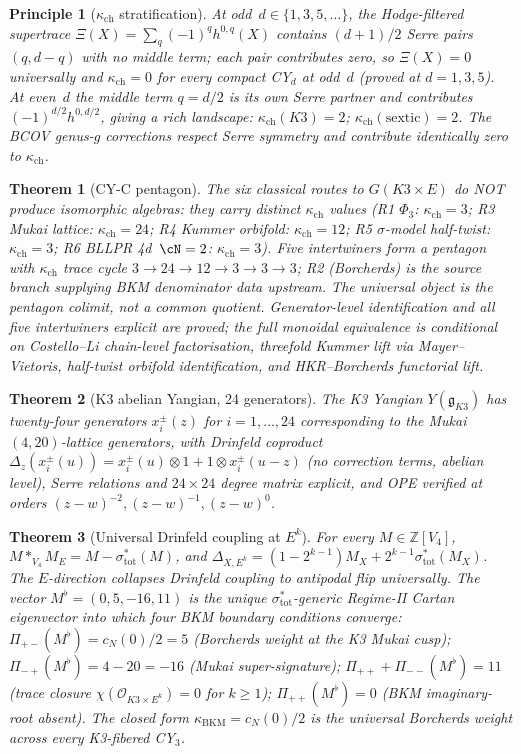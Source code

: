 \documentclass[11pt]{article}
\providecommand{\cO}{\mathcal{O}}
\providecommand{\bZ}{\mathbb{Z}}
\providecommand{\fg}{\mathfrak{g}}
\providecommand{\kBKM}{\kappa_{\mathrm{BKM}}}
\providecommand{\kch}{\kappa_{\mathrm{ch}}}
\newtheorem{theorem}{Theorem}[section]
\newtheorem*{principle}{Principle}
\begin{document}
\begin{principle}[$\kch$ stratification]
At odd~$d\in\{1,3,5,\ldots\}$, the Hodge-filtered supertrace
$\Xi(X) = \sum_q(-1)^q h^{0,q}(X)$ contains $(d+1)/2$ Serre pairs
$(q, d{-}q)$ with no middle term; each pair contributes zero, so
$\Xi(X) = 0$ universally and $\kch = 0$ for every compact CY$_d$ at
odd~$d$ \textup{(}proved at $d=1,3,5$\textup{)}. At even~$d$ the
middle term $q=d/2$ is its own Serre partner and contributes
$(-1)^{d/2}h^{0,d/2}$, giving a rich landscape:
$\kch(K3)=2$; $\kch(\mathrm{sextic})=2$. The BCOV genus-$g$
corrections respect Serre symmetry and contribute identically zero
to $\kch$.
\end{principle}

\begin{theorem}[CY-C pentagon]
The six classical routes to $G(K3\times E)$ do NOT produce
isomorphic algebras: they carry distinct $\kch$ values
\textup{(R1 $\Phi_3$: $\kch=3$; R3 Mukai lattice: $\kch=24$;
R4 Kummer orbifold: $\kch=12$; R5 $\sigma$-model half-twist:
$\kch=3$; R6 BLLPR 4d~$\cN=2$: $\kch=3$\textup{)}}. Five
intertwiners form a pentagon with $\kch$ trace cycle
$3\to 24\to 12\to 3\to 3\to 3$; R2 \textup{(}Borcherds\textup{)} is
the source branch supplying BKM denominator data upstream. The
universal object is the pentagon colimit, not a common quotient.
Generator-level identification and all five intertwiners explicit
are proved; the full monoidal equivalence is conditional on
Costello--Li chain-level factorisation,
threefold Kummer lift via Mayer--Vietoris,
half-twist orbifold identification,
and HKR--Borcherds functorial lift.
\end{theorem}

\begin{theorem}[K3 abelian Yangian, 24 generators]
The K3 Yangian $Y(\fg_{K3})$ has twenty-four generators
$x^{\pm}_i(z)$ for $i=1,\ldots,24$ corresponding to the Mukai
$(4,20)$-lattice generators, with Drinfeld coproduct
$\Delta_z(x^{\pm}_i(u)) = x^{\pm}_i(u)\otimes 1
+ 1\otimes x^{\pm}_i(u-z)$ \textup{(}no correction terms, abelian
level\textup{)}, Serre relations and $24\times 24$ degree matrix
explicit, and OPE verified at orders $(z-w)^{-2}, (z-w)^{-1},
(z-w)^{0}$.
\end{theorem}

\begin{theorem}[Universal Drinfeld coupling at $E^k$]
For every $M\in\bZ[V_4]$,
$M \mathbin{*}_{V_4} M_E = M - \sigma_{\mathrm{tot}}^{*}(M)$, and
$\Delta_{X, E^k} = (1 - 2^{k-1})M_X + 2^{k-1}\sigma_{\mathrm{tot}}^{*}(M_X)$.
The $E$-direction collapses Drinfeld coupling to antipodal flip
universally. The vector $M^{\flat} = (0,5,-16,11)$ is the unique
$\sigma_{\mathrm{tot}}^{*}$-generic Regime-II Cartan eigenvector
into which four BKM boundary conditions converge: $\Pi_{+-}(M^{\flat})
= c_N(0)/2 = 5$ (Borcherds weight at the K3 Mukai cusp);
$\Pi_{-+}(M^{\flat}) = 4-20 = -16$ (Mukai super-signature);
$\Pi_{++} + \Pi_{--}(M^{\flat}) = 11$ (trace closure
$\chi(\cO_{K3\times E^k}) = 0$ for $k\ge 1$);
$\Pi_{++}(M^{\flat}) = 0$ (BKM imaginary-root absent). The closed
form $\kBKM = c_N(0)/2$ is the universal Borcherds weight across
every K3-fibered CY$_3$.
\end{theorem}
\end{document}
